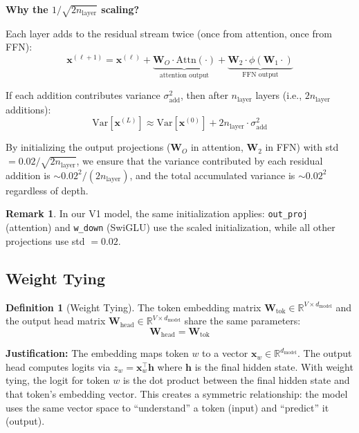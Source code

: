 \documentclass[11pt, a4paper]{article}
\theoremstyle{definition}
\newtheorem{definition}{Definition}[section]
\newtheorem{remark}{Remark}[section]
\newcommand{\vx}{\bm{x}}
\newcommand{\vh}{\bm{h}}
\newcommand{\mW}{\bm{W}}
\newcommand{\reals}{\mathbb{R}}
\newcommand{\Var}{\mathrm{Var}}
\newcommand{\dmodel}{d_{\text{model}}}
\newcommand{\nlayer}{n_{\text{layer}}}
\begin{document}
\textbf{Why the $1/\sqrt{2\nlayer}$ scaling?}

Each layer adds to the residual stream twice (once from attention, once from FFN):
\begin{equation}
    \vx^{(\ell+1)} = \vx^{(\ell)} + \underbrace{\mW_O \cdot \text{Attn}(\cdot)}_{\text{attention output}} + \underbrace{\mW_2 \cdot \phi(\mW_1 \cdot)}_{\text{FFN output}}
\end{equation}

If each addition contributes variance $\sigma^2_{\text{add}}$, then after $\nlayer$ layers (i.e., $2\nlayer$ additions):
\begin{equation}
    \Var[\vx^{(L)}] \approx \Var[\vx^{(0)}] + 2\nlayer \cdot \sigma^2_{\text{add}}
\end{equation}

By initializing the output projections ($\mW_O$ in attention, $\mW_2$ in FFN) with std $= 0.02 / \sqrt{2\nlayer}$, we ensure that the variance contributed by each residual addition is $\sim 0.02^2 / (2\nlayer)$, and the total accumulated variance is $\sim 0.02^2$ regardless of depth.

\begin{remark}
In our V1 model, the same initialization applies: \texttt{out\_proj} (attention) and \texttt{w\_down} (SwiGLU) use the scaled initialization, while all other projections use std $= 0.02$.
\end{remark}

\subsection{Weight Tying}

\begin{definition}[Weight Tying]
The token embedding matrix $\mW_{\text{tok}} \in \reals^{V \times \dmodel}$ and the output head matrix $\mW_{\text{head}} \in \reals^{V \times \dmodel}$ share the same parameters:
\begin{equation}
    \mW_{\text{head}} = \mW_{\text{tok}}
\end{equation}
\end{definition}

\textbf{Justification:} The embedding maps token $w$ to a vector $\vx_w \in \reals^{\dmodel}$. The output head computes logits via $z_w = \vx_w^\top \vh$ where $\vh$ is the final hidden state. With weight tying, the logit for token $w$ is the dot product between the final hidden state and that token's embedding vector. This creates a symmetric relationship: the model uses the same vector space to ``understand'' a token (input) and ``predict'' it (output).
\end{document}
